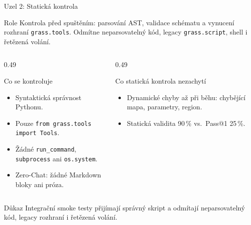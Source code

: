 \documentclass[aspectratio=169,11pt]{beamer}
\begin{document}
\begin{frame}[t]{Uzel 2: Statická kontrola}
  \small
  \begin{block}{Role}
    Kontrola před spuštěním: parsování AST, validace schématu a vynucení
    rozhraní \texttt{grass.tools}. Odmítne neparsovatelný kód, legacy
    \texttt{grass.script}, shell i řetězená volání.
  \end{block}

  \begin{columns}[T,onlytextwidth]
    \begin{column}{0.49\textwidth}
      \begin{block}{Co se kontroluje}
        \begin{itemize}
          \item Syntaktická správnost Pythonu.
          \item Pouze \texttt{from grass.tools import Tools}.
          \item Žádné \texttt{run\_command}, \texttt{subprocess} ani \texttt{os.system}.
          \item Zero-Chat: žádné Markdown bloky ani próza.
        \end{itemize}
      \end{block}
    \end{column}
    \begin{column}{0.49\textwidth}
      \begin{block}{Co statická kontrola nezachytí}
        \begin{itemize}
          \item Dynamické chyby až při běhu: chybějící mapa, parametry, region.
          \item Statická validita 90\,\% vs.\ Pass@1 25\,\%.
        \end{itemize}
      \end{block}
    \end{column}
  \end{columns}

  \begin{alertblock}{Důkaz}
    Integrační smoke testy přijímají správný skript a odmítají neparsovatelný
    kód, legacy rozhraní i řetězená volání.
  \end{alertblock}
\end{frame}
\end{document}
